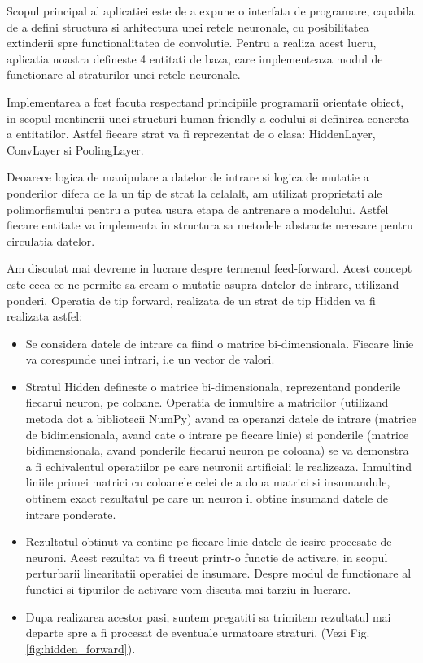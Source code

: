 	\vfill
	
	Scopul principal al aplicatiei este de a expune o interfata de programare, capabila de a defini structura si arhitectura unei retele neuronale, cu posibilitatea extinderii spre functionalitatea de convolutie. Pentru a realiza acest lucru, aplicatia noastra defineste 4 entitati de baza, care implementeaza modul de functionare al straturilor unei retele neuronale. 
	
	Implementarea a fost facuta respectand principiile programarii orientate obiect, in scopul mentinerii unei structuri human-friendly a codului si definirea concreta a entitatilor. Astfel fiecare strat va fi reprezentat de o clasa: HiddenLayer, ConvLayer si PoolingLayer. 
	
	Deoarece logica de manipulare a datelor de intrare si logica de mutatie a ponderilor difera de la un tip de strat la celalalt, am utilizat proprietati ale polimorfismului pentru a putea usura etapa de antrenare a modelului. Astfel fiecare entitate va implementa in structura sa metodele abstracte necesare pentru circulatia datelor. 
	
	Am discutat mai devreme in lucrare despre termenul feed-forward. Acest concept este ceea ce ne permite sa cream o mutatie asupra datelor de intrare, utilizand ponderi. 
	Operatia de tip forward, realizata de un strat de tip Hidden va fi realizata astfel: 
	
	\begin{itemize}
	\item	Se considera datele de intrare ca fiind o matrice bi-dimensionala. Fiecare linie va corespunde unei intrari, i.e un vector de valori.
	
	\item	Stratul Hidden defineste o matrice bi-dimensionala, reprezentand ponderile fiecarui neuron, pe coloane. Operatia de inmultire a matricilor (utilizand metoda dot a bibliotecii NumPy) avand ca operanzi datele de intrare (matrice de bidimensionala, avand cate o intrare pe fiecare linie) si ponderile (matrice bidimensionala, avand ponderile fiecarui neuron pe coloana) se va demonstra a fi echivalentul operatiilor pe care neuronii artificiali le realizeaza.  Inmultind liniile primei matrici cu coloanele celei de a doua matrici si insumandule, obtinem exact rezultatul pe care un neuron il obtine insumand datele de intrare ponderate. 
	
	
	\item	Rezultatul obtinut va contine pe fiecare linie datele de iesire procesate de neuroni. Acest rezultat va fi trecut printr-o functie de activare, in scopul perturbarii linearitatii operatiei de insumare. Despre modul de functionare al functiei si tipurilor de activare vom discuta mai tarziu in lucrare.
	
	\item	Dupa realizarea acestor pasi, suntem pregatiti sa trimitem rezultatul mai departe spre a fi procesat de eventuale urmatoare straturi. (Vezi Fig. \ref{fig:hidden_forward}).
	\end{itemize}

